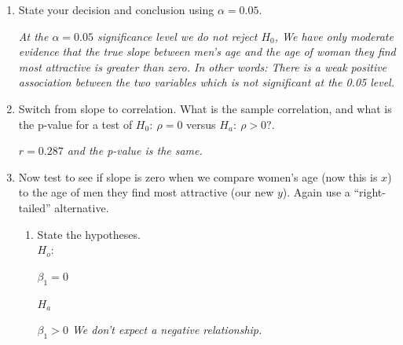 \begin{enumerate}
\begin{key}
  {\it In 10000 shuffles, I had 549 with slope greater than 0.0343, so
  my p--value is 0.055}
\end{key}

\item State your decision and conclusion using $\alpha = 0.05$.
\begin{students}
 \vspace{2cm}      
\end{students}

\begin{key}
  {\it At the $\alpha = 0.05$ significance level we do not reject
    $H_0$, We have only moderate evidence that the true slope between
    men's age and the age of woman they find most attractive is
    greater than zero.  In other words: There is a weak positive
    association between the two variables which is not significant at
    the 0.05 level.}
\end{key}

\item Switch from slope to correlation. What is the sample
  correlation, and what is the p-value for a test of $H_0:\ \rho=0$
  versus $H_a:\ \rho > 0$?.
\begin{students}
 \vspace{1cm}      
\end{students}

\begin{key}
{\it $r = 0.287$ and the p-value is the same.}
\end{key}

\item Now test to see if slope is zero when we compare women's age
  (now this is $x$) to the age of men they find most attractive (our
  new $y$). Again use a ``right-tailed'' alternative.  
  \begin{enumerate}
  \item State the hypotheses.\\
  $H_o:$
\begin{students}
 \vspace{1cm}      
\end{students}
\begin{key}
  {\it  $\beta_1 = 0$   }
\end{key}

  $H_a$
\begin{students}
 \vspace{1cm}      
\end{students}
\begin{key}
  {\it  $\beta_1 > 0$   We don't expect a negative relationship.}
\end{key}


\end{enumerate}
\end{enumerate}

